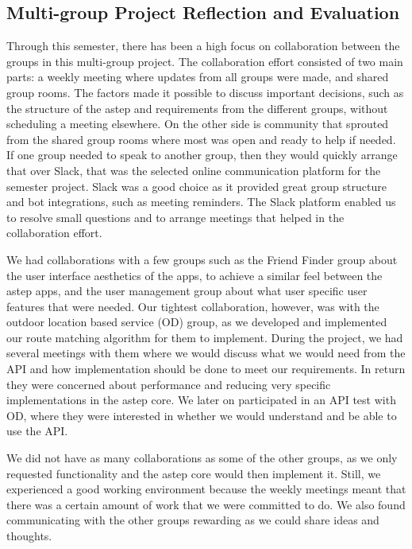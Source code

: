\subsection{Multi-group Project Reflection and Evaluation}
Through this semester, there has been a high focus on collaboration between the groups in this multi-group project.
The collaboration effort consisted of two main parts: a weekly meeting where updates from all groups were made, and shared group rooms.
The factors made it possible to discuss important decisions, such as the structure of the \gls{astep} and requirements from the different groups, without scheduling a meeting elsewhere.
On the other side is community that sprouted from the shared group rooms where most was open and ready to help if needed.
If one group needed to speak to another group, then they would quickly arrange that over Slack, that was the selected online communication platform for the semester project.
Slack was a good choice as it provided great group structure and bot integrations, such as meeting reminders. 
The Slack platform enabled us to resolve small questions and to arrange meetings that helped in the collaboration effort.

We had collaborations with a few groups such as the Friend Finder group about the user interface aesthetics of the apps, to achieve a similar feel between the \gls{astep} apps, and the user management group about what user specific user features that were needed.
Our tightest collaboration, however, was with the outdoor location based service (OD) group, as we developed and implemented our route matching algorithm for them to implement.
During the project, we had several meetings with them where we would discuss what we would need from the API and how implementation should be done to meet our requirements.
In return they were concerned about performance and reducing very specific implementations in the \gls{astep} core.
We later on participated in an API test with OD, where they were interested in whether we would understand and be able to use the API.

We did not have as many collaborations as some of the other groups, as we only requested functionality and the \gls{astep} core would then implement it.
Still, we experienced a good working environment because the weekly meetings meant that there was a certain amount of work that we were committed to do.
We also found communicating with the other groups rewarding as we could share ideas and thoughts.

